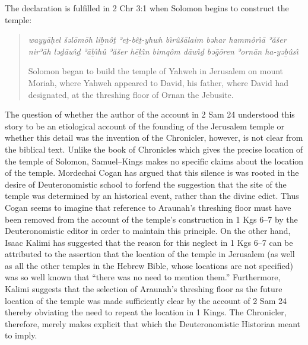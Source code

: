 The declaration is fulfilled in 2 Chr 3:1 when Solomon begins to
construct the temple:

\begin{quote}
\emph{wayyāḥel šəlōmōh liḇnôṯ ʾeṯ-bêṯ-yhwh bı̂rûšālaim bəhar hammôrı̂ā
ʾăšer nirʾāh ləḏāwı̂ḏ ʾāḇı̂hû ʾăšer hēḵı̂n bimqôm dāwı̂ḏ bəḡōren ʾornān
ha-yəḇûsı̂}

Solomon began to build the temple of Yahweh in Jerusalem on mount
Moriah, where Yahweh appeared to David, his father, where David had
designated, at the threshing floor of Ornan the Jebusite.
\end{quote}

The question of whether the author of the account in 2 Sam 24 understood
this story to be an etiological account of the founding of the Jerusalem
temple or whether this detail was the invention of the Chronicler,
however, is not clear from the biblical text. Unlike the book of
Chronicles which gives the precise location of the temple of Solomon,
Samuel--Kings makes no specific claims about the location of the temple.
Mordechai Cogan has argued that this silence is was rooted in the desire
of Deuteronomistic school to forfend the suggestion that the site of the
temple was determined by an historical event, rather than the divine
edict.\autocite[307]{cogan_tarbiz1986} Thus Cogan seems to imagine that
reference to Araunah's threshing floor must have been removed from the
account of the temple's construction in 1 Kgs 6--7 by the
Deuteronomistic editor in order to maintain this
principle.\autocite[307]{cogan_tarbiz1986} On the other hand, Isaac
Kalimi has suggested that the reason for this neglect in 1 Kgs 6--7 can
be attributed to the assertion that the location of the temple in
Jerusalem (as well as all the other temples in the Hebrew Bible, whose
locations are not specified) was so well known that ``there was no need
to mention them.''\autocite[I would, however, make the observation that,
depending on how one dates the account in 1 Kng 6--7, it may be the case
that an \emph{exilic} author genuinely did not know the precise location
of the temple. However, Kalimi also points out that other ANE temple
building texts often neglect to specify the precise location of their
subjects. On this point, I would also hasten to add that monumental
inscriptions should be treated separately, since the location of the
inscription, ostensibly, \emph{would be} the location of the
temple.][355--356]{kalimi_htr1990} Furthermore, Kalimi suggests that the
selection of Araunah's threshing floor as the future location of the
temple was made sufficiently clear by the account of 2 Sam 24 thereby
obviating the need to repeat the location in 1
Kings.\autocite[357]{kalimi_htr1990} The Chronicler, therefore, merely
makes explicit that which the Deuteronomistic Historian meant to imply.

